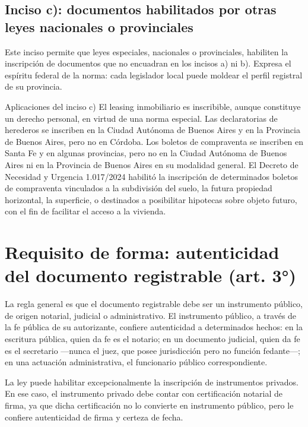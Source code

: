 \documentclass[12pt,oneside]{book}
\begin{document}
\subsection{Inciso c): documentos habilitados por otras leyes nacionales o provinciales}

Este inciso permite que leyes especiales, nacionales o provinciales, habiliten la inscripción de documentos que no encuadran en los incisos a) ni b). Expresa el espíritu federal de la norma: cada legislador local puede moldear el perfil registral de su provincia.

\begin{example}{Aplicaciones del inciso c)}
El leasing inmobiliario es inscribible, aunque constituye un derecho personal, en virtud de una norma especial. Las declaratorias de herederos se inscriben en la Ciudad Autónoma de Buenos Aires y en la Provincia de Buenos Aires, pero no en Córdoba. Los boletos de compraventa se inscriben en Santa Fe y en algunas provincias, pero no en la Ciudad Autónoma de Buenos Aires ni en la Provincia de Buenos Aires en su modalidad general. El Decreto de Necesidad y Urgencia 1.017/2024 habilitó la inscripción de determinados boletos de compraventa vinculados a la subdivisión del suelo, la futura propiedad horizontal, la superficie, o destinados a posibilitar hipotecas sobre objeto futuro, con el fin de facilitar el acceso a la vivienda.
\end{example}

\section{Requisito de forma: autenticidad del documento registrable (art. 3°)}

La regla general es que el documento registrable debe ser un instrumento público, de origen notarial, judicial o administrativo. El instrumento público, a través de la fe pública de su autorizante, confiere autenticidad a determinados hechos: en la escritura pública, quien da fe es el notario; en un documento judicial, quien da fe es el secretario —nunca el juez, que posee jurisdicción pero no función fedante—; en una actuación administrativa, el funcionario público correspondiente.

\begin{important}
La ley puede habilitar excepcionalmente la inscripción de instrumentos privados. En ese caso, el instrumento privado debe contar con certificación notarial de firma, ya que dicha certificación no lo convierte en instrumento público, pero le confiere autenticidad de firma y certeza de fecha.
\end{important}
\end{document}
